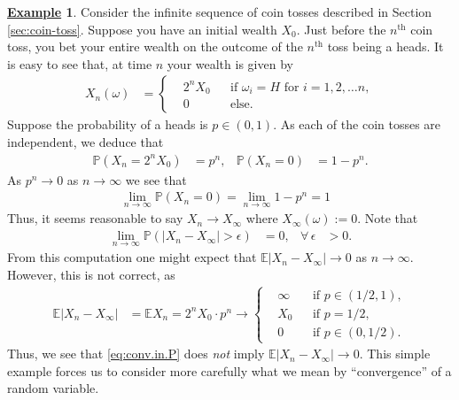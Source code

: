 \documentclass[12pt]{book}
\let\varepsilon\epsilon
\numberwithin{equation}{chapter}
\theoremstyle{plain}
\numberwithin{theorem}{section}
\theoremstyle{definition}
\newtheorem{example}[theorem]{\underline{Example}}
\numberwithin{exercise}{chapter}
\newcommand{\<}{\langle}
\renewcommand{\>}{\rangle}
\renewcommand{\(}{\left(}
\renewcommand{\)}{\right)}
\renewcommand{\[}{\left[}
\renewcommand{\]}{\right]}
\newcommand\Eb{\mathds{E}}
\newcommand\Pb{\mathds{P}}
\newcommand\eps{\varepsilon}
\newcommand\om{\omega}
\begin{document}
\begin{example}
\label{ex:double-or-nothing}
Consider the infinite sequence of coin tosses described in Section \ref{sec:coin-toss}.  Suppose you have an initial wealth $X_0$.  Just before the $n^\text{th}$ coin toss, you bet your entire wealth on the outcome of the $n^\text{th}$ toss being a heads.  It is easy to see that, at time $n$ your wealth is given by
\begin{align}
X_n(\om)
	&=	\left\{ \begin{aligned}
			& 2^n X_0 && \text{if $\om_i = H$ for $i = 1, 2, \ldots n$}, \\
			& 0				&&	\text{else} .
			\end{aligned}  \right.
\end{align}
Suppose the probability of a heads is $p \in (0,1)$.  As each of the coin tosses are independent, we deduce that
\begin{align}
\Pb( X_n = 2^n X_0)
	&=	p^n , &
\Pb( X_n = 0 )
	&=	1 - p^n .
\end{align}
As $p^n \to 0$ as $n \to \infty$ we see that
\begin{align}
\lim_{n \to \infty} 
	\Pb( X_n = 0 ) = \lim_{n \to \infty} 1 - p^n = 1  &
\end{align}
Thus, it seems reasonable to say $X_n \to X_\infty$ where $X_\infty(\om) := 0$.  
Note that
\begin{align}
\lim_{n \to \infty} \Pb( |X_n - X_\infty | > \eps )
	&=	0 , &
\forall \, \eps
	&> 0 . \label{eq:conv.in.P}
\end{align}
From this computation one might expect that
$\Eb | X_n - X_\infty | \to 0$ as $n \to \infty$.  However, this is not correct, as
\begin{align}
\Eb | X_n - X_\infty |
	&=	\Eb X_n
	=		2^n X_0 \cdot p^n
	\to \left\{ \begin{aligned}
	&\infty && \text{if $p \in (1/2,1)$} , \\
	&X_0		&& \text{if $p = 1/2$}, \\
	&0			&& \text{if $p \in (0,1/2)$} .
	\end{aligned} \right.
\end{align}
Thus, we see that \eqref{eq:conv.in.P} does \textit{not} imply $\Eb | X_n - X_\infty | \to 0$.  This simple example forces us to consider more carefully what we mean by ``convergence'' of a random variable.
\end{example}

\end{document}
